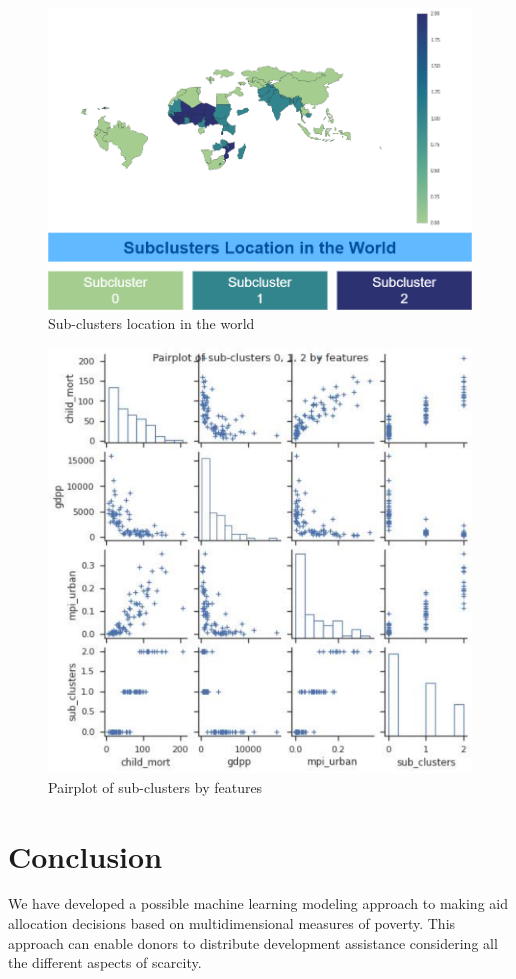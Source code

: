 \documentclass{swfuthesise}
\begin{document}
\begin{figure}[!htp]
  \centering%
  \includegraphics[width=.6\linewidth]{figs/subclusters-location}
  \caption{Sub-clusters location in the world}
  \label{fig:subclusters-location}
\end{figure}

\begin{figure}[!htp]
    \centering
    \includegraphics[width=.8\linewidth]{figs/pairplot-subclusters}
    \caption{Pairplot of sub-clusters by features}
    \label{fig:pairplot-subclusters}
\end{figure}

\chapter{Conclusion}
We have developed a possible machine learning modeling approach to making aid allocation decisions based on multidimensional measures of poverty. This approach can enable donors to distribute development assistance considering all the different aspects of scarcity.
\end{document}

